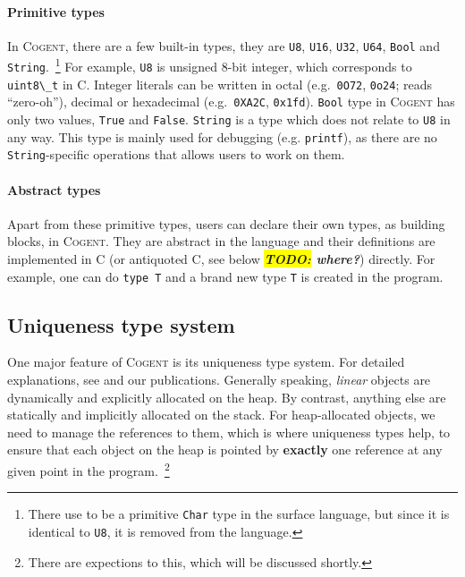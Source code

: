 \documentclass[a4paper]{article}
\newcommand{\inlinecogent}[1]{\lstinline[language=Cogent,basicstyle=\ttfamily\normalsize]{#1}\xspace}
\newcommand{\inlinec}[1]{\lstinline[language=antiC,basicstyle=\ttfamily\normalsize]{#1}\xspace}
\newcommand{\TODO}[1]{\textbf{\textsl{\colorbox{yellow}{TODO:} #1}}}
\newcommand{\todo}[1]{\TODO{#1}}
\newcommand{\cogent}{\textsc{Cogent}\xspace}
\begin{document}
\paragraph{Primitive types} In \cogent, there are a few built-in types, they are \inlinecogent{U8},
\inlinecogent{U16}, \inlinecogent{U32}, \inlinecogent{U64}, \inlinecogent{Bool} and \inlinecogent{String}.~\footnote{There
use to be a primitive \inlinecogent{Char} type in the surface language, but since it is
identical to \inlinecogent{U8}, it is removed from the language.} For example, \inlinecogent{U8} is unsigned
8-bit integer, which corresponds to
\inlinec{uint8\_t} in C. Integer literals can be written in octal (e.g.\ \inlinecogent{0O72}, \inlinecogent{0o24};
reads ``zero-oh''), decimal or hexadecimal (e.g.\ \inlinecogent{0XA2C}, \inlinecogent{0x1fd}). \inlinecogent{Bool}
type in \cogent has only two values, \inlinecogent{True} and \inlinecogent{False}.
\inlinecogent{String} is a type which does not relate to \inlinecogent{U8} in any way. This type is mainly used
for debugging (e.g. \inlinecogent{printf}),
as there are no \inlinecogent{String}-specific operations that allows users to work on them.

\paragraph{Abstract types} Apart from these primitive types, users can declare their own types, as building blocks, in \cogent.
They are abstract in the language and their definitions are implemented in C (or antiquoted C, see below \todo{where?}) directly.
For example, one can do \inlinecogent{type T} and a brand new type \inlinecogent{T} is created in the program.

\subsection{Uniqueness type system}
One major feature of \cogent is its uniqueness type system. For detailed explanations, see \cite{Wadler_90} and our publications.
Generally speaking, \emph{linear} objects are dynamically and explicitly allocated on the heap. By contrast, anything else are
statically and implicitly allocated on the stack. For heap-allocated objects, we need to manage the references to them, which is
where uniqueness types help, to ensure that each object on the heap is pointed by \textbf{exactly} one reference at any
given point in the program.~\footnote{There are expections to this, which will be discussed shortly.}
\end{document}
